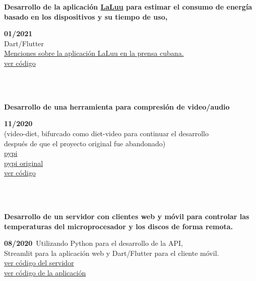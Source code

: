 \documentclass{article}
\begin{document}
    \begin{minipage}{0.8\textwidth}
    \parbox{0.8\linewidth}{\textbf{Desarrollo de la aplicación \hyperref[sec:laluu]{LaLuu} para estimar el consumo de energía basado en los dispositivos y su tiempo de uso,}} \hfill \textbf{01/2021}\\
    Dart/Flutter\\
    \hyperref[sec:laluu_press]{Menciones sobre la aplicación LaLuu en la prensa cubana.}\\
    \href{https://github.com/geeksLabTech/LaLuu}{ver código}\\
    \end{minipage} \hfill {}\\\\
    \begin{minipage}{0.8\textwidth}
    \parbox{0.8\linewidth}{\textbf{Desarrollo de una herramienta para compresión de video/audio}} \hfill \textbf{11/2020}\\
    (video-diet, bifurcado como diet-video para continuar el desarrollo \\
    después de que el proyecto original fue abandonado)\\
    \href{https://pypi.org/project/diet-video/}{pypi}\\
    \href{https://pypi.org/project/video-diet/}{pypi original}\\
    \href{https://github.com/JavierOramas/video-diet}{ver código}\\
    \end{minipage} \hfill {}\\\\
    \begin{minipage}{0.8\textwidth}
    \parbox{0.8\linewidth}{\textbf{Desarrollo de un servidor con clientes web y móvil para controlar las temperaturas del microprocesador y los discos de forma remota.}} \hfill \textbf{08/2020}\
    Utilizando Python para el desarrollo de la API, \\ 
    Streamlit para la aplicación web y Dart/Flutter para el cliente móvil.\\
    \href{https://github.com/JavierOramas/temperatureMonitor}{ver código del servidor}\\
    \href{https://github.com/JavierOramas/temperatureMonitor-app}{ver código de la aplicación}\\
    \end{minipage} \hfill {}\\\\
\end{document}
